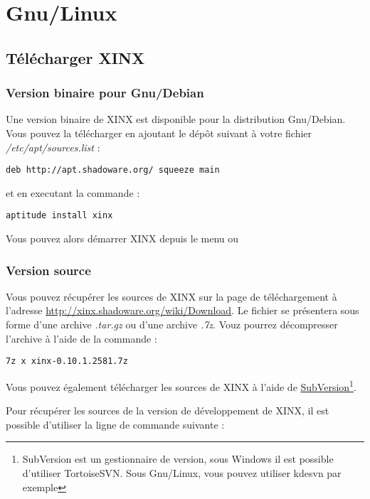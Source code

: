 \documentclass[a4paper,10pt,twoside,titlepage,onecolumn]{book}
\begin{document}
\section{Gnu/Linux}

\subsection{Télécharger XINX}

\subsubsection{Version binaire pour Gnu/Debian}

Une version binaire de XINX est disponible pour la distribution Gnu/Debian. Vous pouvez la télécharger en ajoutant le dépôt suivant à votre fichier \emph{/etc/apt/sources.list} :

\begin{verbatim}
deb http://apt.shadoware.org/ squeeze main
\end{verbatim}

et en executant la commande :

\begin{verbatim}
aptitude install xinx
\end{verbatim}

Vous pouvez alors démarrer XINX depuis le menu ou 

\subsubsection{Version source}

Vous pouvez récupérer les sources de XINX sur la page de téléchargement à l'adresse \url{http://xinx.shadoware.org/wiki/Download}. Le fichier se présentera sous forme d'une archive \emph{.tar.gz} ou d'une archive \emph{.7z}. Vouz pourrez décompresser l'archive à l'aide de la commande :

\begin{verbatim}
7z x xinx-0.10.1.2581.7z
\end{verbatim}

Vous pouvez également télécharger les sources de XINX à l'aide de \href{http://subversion.tigris.org/}{SubVersion}\footnote{SubVersion est un gestionnaire de version, sous Windows il est possible d'utiliser TortoiseSVN. Sous Gnu/Linux, vous pouvez utiliser kdesvn par exemple}.

Pour récupérer les sources de la version de développement de XINX, il est possible d'utiliser la ligne de commande suivante :
\end{document}
